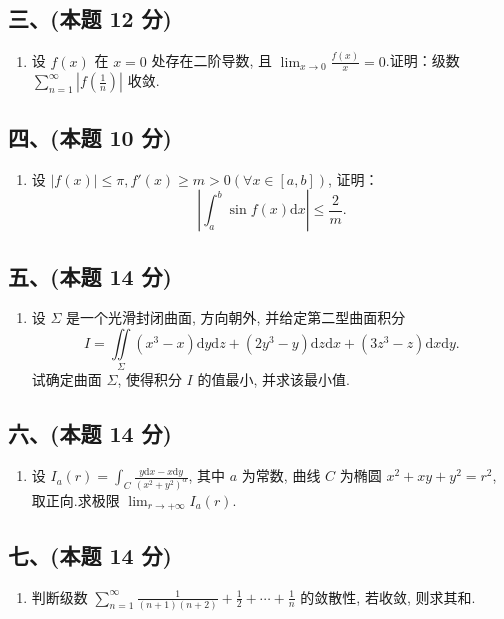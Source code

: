 \subsection*{三、(本题 12 分)}
\begin{enumerate}[start=6]
    \item 设 $f(x)$ 在 $x = 0$ 处存在二阶导数,  且 $\displaystyle\lim_{x \to 0} \frac{f(x)}{x} = 0$.证明：级数 $\displaystyle\sum_{n=1}^{\infty} \left| f\left( \frac{1}{n} \right) \right|$ 收敛.
\end{enumerate}

\subsection*{四、(本题 10 分)}
\begin{enumerate}[start=7]
    \item 设 $|f(x)| \leqslant \pi,  f'(x) \geqslant m > 0  (\forall x \in [a,  b])$,  证明：
          \[
              \left| \int_a^b \sin f(x)  \mathrm{d}x \right| \leqslant \frac{2}{m}.
          \]
\end{enumerate}

\subsection*{五、(本题 14 分)}
\begin{enumerate}[start=8]
    \item 设 $\Sigma$ 是一个光滑封闭曲面,  方向朝外,  并给定第二型曲面积分
          \[
              I = \iint\limits_{\Sigma} (x^3 - x)  \mathrm{d}y  \mathrm{d}z + (2y^3 - y)  \mathrm{d}z  \mathrm{d}x + (3z^3 - z)  \mathrm{d}x  \mathrm{d}y.
          \]
          试确定曲面 $\Sigma$,  使得积分 $I$ 的值最小,  并求该最小值.
\end{enumerate}

\subsection*{六、(本题 14 分)}
\begin{enumerate}[start=9]
    \item 设 $I_a(r) = \displaystyle\int_C \frac{y  \mathrm{d}x - x  \mathrm{d}y}{(x^2 + y^2)^\alpha}$,  其中 $a$ 为常数,  曲线 $C$ 为椭圆 $x^2 + xy + y^2 = r^2$,  取正向.求极限 $\displaystyle\lim_{r \to +\infty} I_a(r)$.
\end{enumerate}

\subsection*{七、(本题 14 分)}
\begin{enumerate}[start=10]
    \item 判断级数 $\displaystyle\sum_{n=1}^{\infty} \frac{1}{(n+1)(n+2)} + \frac{1}{2} + \cdots + \frac{1}{n}$ 的敛散性,  若收敛,  则求其和.
\end{enumerate}


